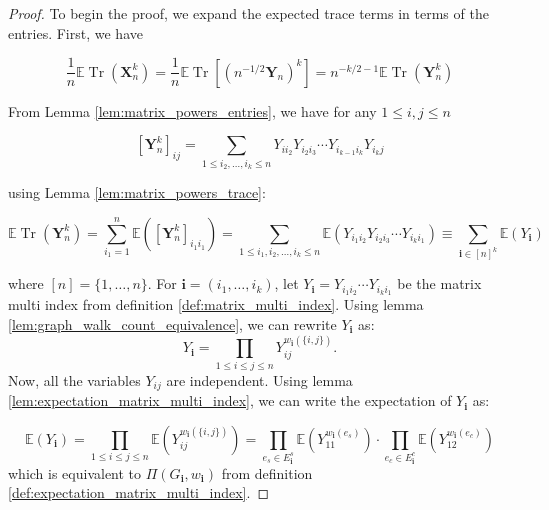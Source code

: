 \begin{proof}
\notready
To begin the proof, we expand the expected trace terms in terms of the entries. First, we have

$$
\frac{1}{n} \mathbb{E} \operatorname{Tr}\left(\mathbf{X}_n^k\right)=\frac{1}{n} \mathbb{E} \operatorname{Tr}\left[\left(n^{-1 / 2} \mathbf{Y}_n\right)^k\right]=n^{-k / 2-1} \mathbb{E} \operatorname{Tr}\left(\mathbf{Y}_n^k\right)
$$


From Lemma \ref{lem:matrix_powers_entries}, we have for any $1 \leq i, j \leq n$

$$
\left[\mathbf{Y}_n^k\right]_{i j}=\sum_{1 \leq i_2, \ldots, i_k \leq n} Y_{i i_2} Y_{i_2 i_3} \cdots Y_{i_{k-1} i_k} Y_{i_k j}
$$


using Lemma \ref{lem:matrix_powers_trace}:

$$
\mathbb{E} \operatorname{Tr}\left(\mathbf{Y}_n^k\right)=\sum_{i_1=1}^n \mathbb{E}\left(\left[\mathbf{Y}_n^k\right]_{i_1 i_1}\right)=\sum_{1 \leq i_1, i_2, \ldots, i_k \leq n} \mathbb{E}\left(Y_{i_1 i_2} Y_{i_2 i_3} \cdots Y_{i_k i_1}\right) \equiv \sum_{\mathbf{i} \in[n]^k} \mathbb{E}\left(Y_{\mathbf{i}}\right)
$$

where $[n]=\{1, \ldots, n\}$. For $\mathbf{i}=\left(i_1, \ldots, i_k\right)$, let $Y_{\mathbf{i}}=Y_{i_1 i_2} \cdots Y_{i_k i_1}$ be the matrix multi index from definition \ref{def:matrix_multi_index}. Using lemma \ref{lem:graph_walk_count_equivalence}, we can rewrite $Y_{\mathbf{i}}$ as:
$$
Y_{\mathbf{i}}=\prod_{1 \leq i \leq j \leq n} Y_{i j}^{w_{\mathbf{i}}(\{i, j\})}.
$$
Now, all the variables $Y_{i j}$ are independent. Using lemma \ref{lem:expectation_matrix_multi_index}, we can write the expectation of $Y_{\mathbf{i}}$ as:

$$
\mathbb{E}\left(Y_{\mathbf{i}}\right)=\prod_{1 \leq i \leq j \leq n} \mathbb{E}\left(Y_{i j}^{w_{\mathbf{i}}(\{i, j\})}\right)=\prod_{e_s \in E_{\mathbf{i}}^s} \mathbb{E}\left(Y_{11}^{w_{\mathbf{i}}\left(e_s\right)}\right) \cdot \prod_{e_c \in E_{\mathbf{i}}^c} \mathbb{E}\left(Y_{12}^{w_{\mathbf{i}}\left(e_c\right)}\right)
$$
which is equivalent to $\Pi(G_{\mathbf{i}}, w_{\mathbf{i}})$ from definition \ref{def:expectation_matrix_multi_index}.

\end{proof}

%


